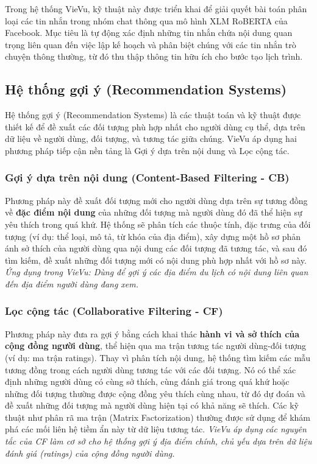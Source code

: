 Trong hệ thống VieVu, kỹ thuật này được triển khai để giải quyết bài toán phân loại các tin nhắn trong nhóm chat thông qua mô hình XLM RoBERTA của Facebook. Mục tiêu là tự động xác định những tin nhắn chứa nội dung quan trọng liên quan đến việc lập kế hoạch và phân biệt chúng với các tin nhắn trò chuyện thông thường, từ đó thu thập thông tin hữu ích cho bước tạo lịch trình. 


\subsection{Hệ thống gợi ý (Recommendation Systems)} 

Hệ thống gợi ý (Recommendation Systems) là các thuật toán và kỹ thuật được thiết kế để đề xuất các đối tượng phù hợp nhất cho người dùng cụ thể, dựa trên dữ liệu về người dùng, đối tượng, và tương tác giữa chúng. VieVu áp dụng hai phương pháp tiếp cận nền tảng là Gợi ý dựa trên nội dung và Lọc cộng tác.

\subsubsection{Gợi ý dựa trên nội dung (Content-Based Filtering - CB)\cite{cb_concept}} 
Phương pháp này đề xuất đối tượng mới cho người dùng dựa trên sự tương đồng về \textbf{đặc điểm nội dung} của những đối tượng mà người dùng đó đã thể hiện sự yêu thích trong quá khứ. Hệ thống sẽ phân tích các thuộc tính, đặc trưng của đối tượng (ví dụ: thể loại, mô tả, từ khóa của địa điểm), xây dựng một hồ sơ phản ánh sở thích của người dùng qua nội dung các đối tượng đã tương tác, và sau đó tìm kiếm, đề xuất những đối tượng mới có nội dung phù hợp nhất với hồ sơ này.
\textit{Ứng dụng trong VieVu: Dùng để gợi ý các địa điểm du lịch có nội dung liên quan đến địa điểm người dùng đang xem.}

\subsubsection{Lọc cộng tác (Collaborative Filtering - CF)\cite{cf_concept}} 
Phương pháp này đưa ra gợi ý bằng cách khai thác \textbf{hành vi và sở thích của cộng đồng người dùng}, thể hiện qua ma trận tương tác người dùng-đối tượng (ví dụ: ma trận ratings). Thay vì phân tích nội dung, hệ thống tìm kiếm các mẫu tương đồng trong cách người dùng tương tác với các đối tượng. Nó có thể xác định những người dùng có cùng sở thích, cùng đánh giá trong quá khứ hoặc những đối tượng thường được cộng đồng yêu thích cùng nhau, từ đó dự đoán và đề xuất những đối tượng mà người dùng hiện tại có khả năng sẽ thích. Các kỹ thuật như phân rã ma trận (Matrix Factorization) thường được sử dụng để khám phá các mối liên hệ tiềm ẩn này từ dữ liệu tương tác.
\textit{VieVu áp dụng các nguyên tắc của CF làm cơ sở cho hệ thống gợi ý địa điểm chính, chủ yếu dựa trên dữ liệu đánh giá (ratings) của cộng đồng người dùng.}

